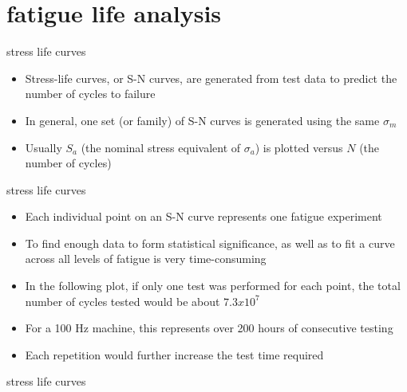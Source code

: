\documentclass[10pt]{beamer}
\begin{document}
\section{fatigue life analysis}

\begin{frame}{stress life curves}
	\begin{itemize}[<+->]
		\item Stress-life curves, or S-N curves, are generated from test data to predict the number of cycles to failure
		\item In general, one set (or family) of S-N curves is generated using the same $\sigma_m$
		\item Usually $S_a$ (the nominal stress equivalent of $\sigma_a$) is plotted versus $N$ (the number of cycles)
	\end{itemize}
\end{frame}

\begin{frame}{stress life curves}
	\begin{itemize}[<+->]
		\item Each individual point on an S-N curve represents one fatigue experiment
		\item To find enough data to form statistical significance, as well as to fit a curve across all levels of fatigue is very time-consuming
		\item In the following plot, if only one test was performed for each point, the total number of cycles tested would be about $7.3x10^7$
		\item For a 100 Hz machine, this represents over 200 hours of consecutive testing
		\item Each repetition would further increase the test time required
	\end{itemize}
\end{frame}

\begin{frame}{stress life curves}
\end{frame}
\end{document}
